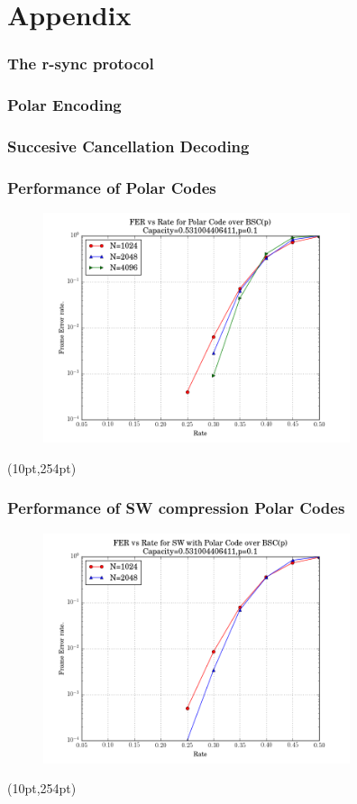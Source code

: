 \documentclass[xcolor=dvipsnames]{beamer}
\newcommand\hyperback[1]{%
  \begin{textblock*}{\paperwidth}(10pt,254pt)
    \raggedright #1\hspace{.5em}
  \end{textblock*}}
\begin{document}
\section{Appendix}
\begin{frame}[label = rsync]
\frametitle{The r-sync protocol}
\hyperlink{rsynccomp}{}
\end{frame}
\begin{frame}[label = polarencode]
\frametitle{Polar Encoding}
\hyperlink{polarencodedecode}{}
\end{frame}
\begin{frame}[label = polardecode]
\frametitle{Succesive Cancellation Decoding}
\hyperlink{polarencodedecode}{}
\end{frame}
\begin{frame}[label = polarperformance]
\frametitle{Performance of Polar Codes}
\begin{figure}
\centering
\includegraphics[width=9cm]{./fer.png}
\end{figure}
\hyperback{\hyperlink{polarencodedecode}{}}
\end{frame}
\begin{frame}[label = polarswperformance]
\frametitle{Performance of SW compression Polar Codes}
\begin{figure}
\centering
\includegraphics[width=9cm]{./swfer.png}
\end{figure}
\hyperback{\hyperlink{polarslepian}{}}
\end{frame}
\end{document}
